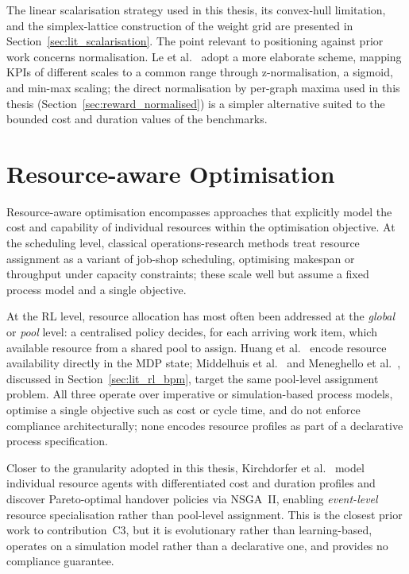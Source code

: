 The linear scalarisation strategy used in this thesis, its convex-hull
limitation, and the simplex-lattice construction of the weight grid are
presented in Section~\ref{sec:lit_scalarisation}. The point relevant to
positioning against prior work concerns normalisation. Le et
al.~\cite{Le2026BalancingAnalytics} adopt a more elaborate scheme, mapping
KPIs of different scales to a common range through z-normalisation, a
sigmoid, and min-max scaling; the direct normalisation by per-graph maxima
used in this thesis (Section~\ref{sec:reward_normalised}) is a simpler
alternative suited to the bounded cost and duration values of the benchmarks.

\section{Resource-aware Optimisation}
\label{sec:lit_resources}

Resource-aware optimisation encompasses approaches that explicitly model
the cost and capability of individual resources within the optimisation
objective. At the scheduling level, classical operations-research
methods treat resource assignment as a variant of job-shop scheduling,
optimising makespan or throughput under capacity constraints; these
scale well but assume a fixed process model and a single objective.

At the \ac{RL} level, resource allocation has most often been addressed
at the \emph{global} or \emph{pool} level: a centralised policy decides,
for each arriving work item, which available resource from a shared pool
to assign. Huang et al.~\cite{Huang2011ReinforcementManagement} encode
resource availability directly in the \ac{MDP} state; Middelhuis et
al.~\cite{Middelhuis2025LearningProcesses} and Meneghello et
al.~\cite{Meneghello2024OptimizingLearning}, discussed in
Section~\ref{sec:lit_rl_bpm}, target the same pool-level assignment
problem. All three operate over imperative or simulation-based process
models, optimise a single objective such as cost or cycle time, and do
not enforce compliance architecturally; none encodes resource profiles
as part of a declarative process specification.

Closer to the granularity adopted in this thesis, Kirchdorfer et
al.~\cite{KirchdorferLukasFromPolicies} model individual resource agents
with differentiated cost and duration profiles and discover
Pareto-optimal handover policies via \ac{NSGA}~II, enabling
\emph{event-level} resource specialisation rather than pool-level
assignment. This is the closest prior work to contribution~C3, but it is
evolutionary rather than learning-based, operates on a simulation model
rather than a declarative one, and provides no compliance guarantee.

